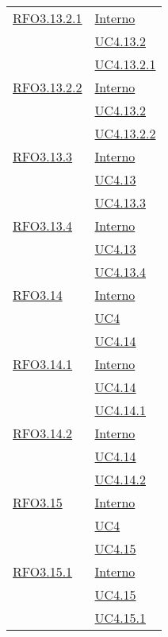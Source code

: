 \begin{longtable}{|>{\centering}m{5cm}|m{5cm}<{\centering}|}
\hyperlink{RFO3.13.2.1}{RFO3.13.2.1} &  \hyperlink{Interno}{Interno}\\ &\hyperref[UC4.13.2]{UC4.13.2}\\ &\hyperref[UC4.13.2.1]{UC4.13.2.1}\\ \hline

\hyperlink{RFO3.13.2.2}{RFO3.13.2.2} &  \hyperlink{Interno}{Interno}\\ &\hyperref[UC4.13.2]{UC4.13.2}\\ &\hyperref[UC4.13.2.2]{UC4.13.2.2}\\ \hline

\hyperlink{RFO3.13.3}{RFO3.13.3} & \hyperlink{Interno}{Interno}\\ &\hyperref[UC4.13]{UC4.13}\\ &\hyperref[UC4.13.3]{UC4.13.3}\\ \hline

\hyperlink{RFO3.13.4}{RFO3.13.4} &  \hyperlink{Interno}{Interno}\\ &\hyperref[UC4.13]{UC4.13}\\ &\hyperref[UC4.13.4]{UC4.13.4}\\ \hline

\hyperlink{RFO3.14}{RFO3.14} & \hyperlink{Interno}{Interno}\\ &\hyperref[UC4]{UC4}\\ &\hyperref[UC4.14]{UC4.14}\\ \hline

\hyperlink{RFO3.14.1}{RFO3.14.1} &  \hyperlink{Interno}{Interno}\\ &\hyperref[UC4.14]{UC4.14}\\ &\hyperref[UC4.14.1]{UC4.14.1}\\ \hline

\hyperlink{RFO3.14.2}{RFO3.14.2} &   \hyperlink{Interno}{Interno}\\ &\hyperref[UC4.14]{UC4.14}\\ &\hyperref[UC4.14.2]{UC4.14.2}\\ \hline

\hyperlink{RFO3.15}{RFO3.15} &   \hyperlink{Interno}{Interno}\\ &\hyperref[UC4]{UC4}\\ &\hyperref[UC4.15]{UC4.15}\\ \hline

\hyperlink{RFO3.15.1}{RFO3.15.1} &   \hyperlink{Interno}{Interno}\\ &\hyperref[UC4.15]{UC4.15}\\ &\hyperref[UC4.15.1]{UC4.15.1}\\ \hline


\end{longtable}
